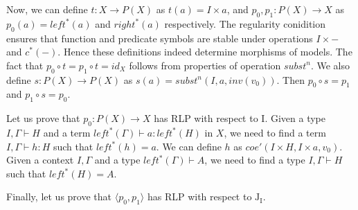 \documentclass[reqno]{amsart}
\theoremstyle{definition}
\theoremstyle{remark}
\newcommand{\I}{\mathrm{I}}
\newcommand{\J}{\mathrm{J}}
\numberwithin{figure}{section}
\begin{document}
Now, we can define $t : X \to P(X)$ as $t(a) = I \times a$, and $p_0,p_1 : P(X) \to X$ as $p_0(a) = left^*(a)$ and $right^*(a)$ respectively.
The regularity conidition ensures that function and predicate symbols are stable under operations $I \times -$ and $c^*(-)$.
Hence these definitions indeed determine morphisms of models.
The fact that $p_0 \circ t = p_1 \circ t = id_X$ follows from properties of operation $subst^n$.
We also define $s : P(X) \to P(X)$ as $s(a) = subst^n(I, a, inv(v_0))$.
Then $p_0 \circ s = p_1$ and $p_1 \circ s = p_0$.

Let us prove that $p_0 : P(X) \to X$ has RLP with respect to $\I$.
Given a type $I, \Gamma \vdash H$ and a term $left^*(\Gamma) \vdash a : left^*(H)$ in $X$,
we need to find a term $I, \Gamma \vdash h : H$ such that $left^*(h) = a$.
We can define $h$ as $coe'(I \times H, I \times a, v_0)$.
Given a context $I, \Gamma$ and a type $left^*(\Gamma) \vdash A$,
we need to find a type $I, \Gamma \vdash H$ such that $left^*(H) = A$.

Finally, let us prove that $\langle p_0, p_1 \rangle$ has RLP with respect to $\J_\I$.

\end{document}
